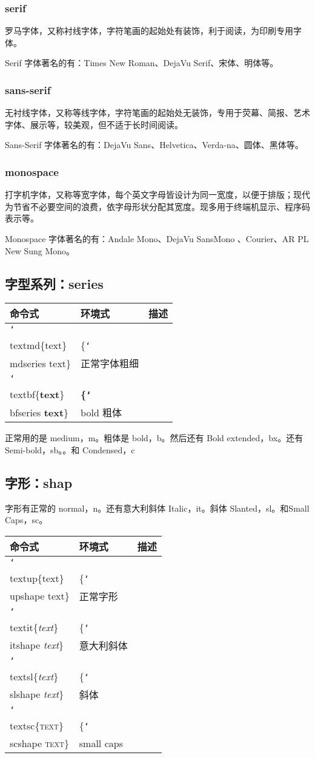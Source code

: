 \documentclass[a4paper]{article}
\newcommand\tbs[1][]{\tt\char`\\#1}
\begin{document}
    \subsubsection{serif}
       罗马字体，又称衬线字体，字符笔画的起始处有装饰，利于阅读，为印刷专用字体。

      Serif 字体著名的有：Times New Roman、DejaVu Serif、宋体、明体等。
    \subsubsection{sans-serif}
       无衬线字体，又称等线字体，字符笔画的起始处无装饰，专用于荧幕、简报、艺术字体、展示等，较美观，但不适于长时间阅读。

      Sans-Serif 字体著名的有：DejaVu Sans、Helvetica、Verda-na、圆体、黑体等。
    \subsubsection{monospace}
      打字机字体，又称等宽字体，每个英文字母皆设计为同一宽度，以便于排版；现代为节省不必要空间的浪费，依字母形状分配其宽度。现多用于终端机显示、程序码表示等。

      Monospace 字体著名的有：Andale Mono、DejaVu SansMono 、Courier、AR PL New Sung Mono。
  \subsection{字型系列：series}
    \begin{tabular}{|l|l|l|}
      \hline
      命令式 & 环境式 & 描述\\
      \hline
      \tbs{textmd}\{text\} & \{\tbs{mdseries} text\} & 正常字体粗细 \\
      \hline
      \tbs{textbf}\{\textbf{text}\} & \bfseries\{\tbs{bfseries} \textbf{text}\} & bold 粗体 \\
      \hline
    \end{tabular}

    正常用的是 medium，m。粗体是 bold，b。然后还有 Bold extended，bx。还有Semi-bold，sb。。和 Condensed，c
  \subsection{字形：shap}
    字形有正常的 normal，n。还有意大利斜体 Italic，it。斜体 Slanted，sl。和Small Caps，sc。

    \begin{tabular}{|l|l|l|}
      \hline
      命令式 & 环境式 & 描述\\
      \hline
      \tbs{textup}\{text\} & \{\tbs{upshape} text\} & 正常字形 \\
      \hline
      \tbs{textit}\{\textit{text}\} & \{\tbs{itshape} \textit{text}\} & 意大利斜体 \\
      \hline
      \tbs{textsl}\{\textsl{text}\} & \{\tbs{slshape} \textsl{text}\} & 斜体 \\
      \hline
      \tbs{textsc}\{\textsc{text}\} & \{\tbs{scshape} \textsc{text}\} & small caps \\
      \hline
    \end{tabular}
\end{document}
